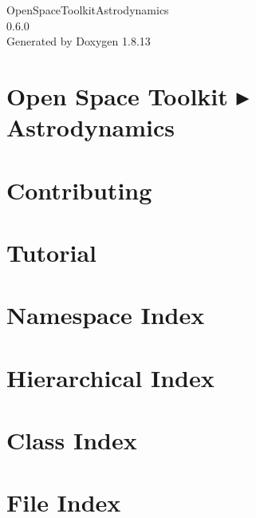 \documentclass[twoside]{book}
\newcommand{\+}{\discretionary{\mbox{\scriptsize$\hookleftarrow$}}{}{}}
\newcommand{\clearemptydoublepage}{%
  \newpage{\pagestyle{empty}\cleardoublepage}%
}
\begin{document}
\hypersetup{pageanchor=false,
             bookmarksnumbered=true,
             pdfencoding=unicode
            }
\begin{titlepage}
\vspace*{7cm}
\begin{center}%
{\Large Open\+Space\+Toolkit\+Astrodynamics \\[1ex]\large 0.\+6.\+0 }\\
\vspace*{1cm}
{\large Generated by Doxygen 1.8.13}\\
\end{center}
\end{titlepage}
\clearemptydoublepage
{}
\tableofcontents
\clearemptydoublepage
{}
\hypersetup{pageanchor=true}

\chapter{Open Space Toolkit ▸ Astrodynamics}
\label{index}\hypertarget{index}{}
\chapter{Contributing}
\label{md__c_o_n_t_r_i_b_u_t_i_n_g}

\chapter{Tutorial}
\label{md_docs__tutorial}

\chapter{Namespace Index}

\chapter{Hierarchical Index}

\chapter{Class Index}

\chapter{File Index}

\end{document}
